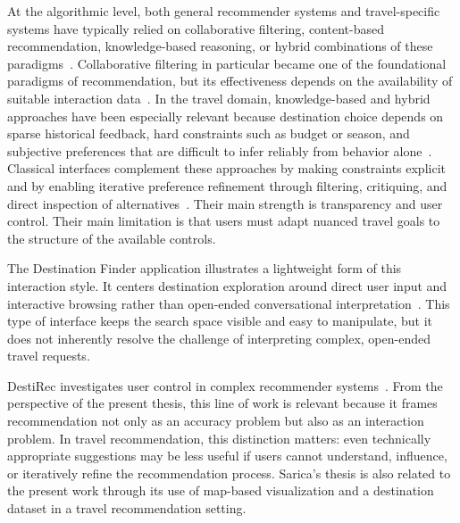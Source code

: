 At the algorithmic level, both general recommender systems and travel-specific systems have typically relied on collaborative filtering, content-based recommendation, knowledge-based reasoning, or hybrid combinations of these paradigms~\parencite{burkeHybridSurvey}. Collaborative filtering in particular became one of the foundational paradigms of recommendation, but its effectiveness depends on the availability of suitable interaction data~\parencite{suKhoshgoftaarCollaborativeFiltering}. In the travel domain, knowledge-based and hybrid approaches have been especially relevant because destination choice depends on sparse historical feedback, hard constraints such as budget or season, and subjective preferences that are difficult to infer reliably from behavior alone~\parencite{chaudhariTravelSurvey}. Classical interfaces complement these approaches by making constraints explicit and by enabling iterative preference refinement through filtering, critiquing, and direct inspection of alternatives~\parencite{chenPuCritiquing}. Their main strength is transparency and user control. Their main limitation is that users must adapt nuanced travel goals to the structure of the available controls.

The Destination Finder application illustrates a lightweight form of this interaction style. It centers destination exploration around direct user input and interactive browsing rather than open-ended conversational interpretation~\parencite{destinationFinder}. This type of interface keeps the search space visible and easy to manipulate, but it does not inherently resolve the challenge of interpreting complex, open-ended travel requests.

DestiRec investigates user control in complex recommender systems~\parencite{saricaDestirec}. From the perspective of the present thesis, this line of work is relevant because it frames recommendation not only as an accuracy problem but also as an interaction problem. In travel recommendation, this distinction matters: even technically appropriate suggestions may be less useful if users cannot understand, influence, or iteratively refine the recommendation process. Sarica's thesis is also related to the present work through its use of map-based visualization and a destination dataset in a travel recommendation setting.

